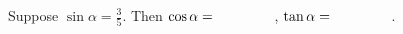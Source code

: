\documentclass[nooutcomes]{ximera}
\begin{document}
%

\begin{problem}
Suppose $\sin\alpha = \frac{3}{5}$.  Then $\cos\alpha = \hspace{0.6in}$, $\tan\alpha = \hspace{0.6in}$.  
\vfill
\end{problem}
\end{document}
